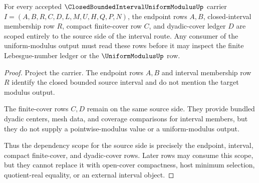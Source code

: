 \begin{theorem}
\label{thm:closed-bounded-interval-uniform-modulus-dyadic-cover-scope}
For every accepted $\ClosedBoundedIntervalUniformModulusUp$ carrier $I=(A,B,R,C,D,L,M,U,H,Q,P,N)$, the endpoint rows $A,B$, closed-interval membership row $R$, compact finite-cover row $C$, and dyadic-cover ledger $D$ are scoped entirely to the source side of the interval route. Any consumer of the uniform-modulus output must read these rows before it may inspect the finite Lebesgue-number ledger or the $\UniformModulusUp$ row.
\end{theorem}
\begin{proof}
Project the carrier. The endpoint rows $A,B$ and interval membership row $R$ identify the closed bounded source interval and do not mention the target modulus output.

The finite-cover rows $C,D$ remain on the same source side. They provide bundled dyadic centers, mesh data, and coverage comparisons for interval members, but they do not supply a pointwise-modulus value or a uniform-modulus output.

Thus the dependency scope for the source side is precisely the endpoint, interval, compact finite-cover, and dyadic-cover rows. Later rows may consume this scope, but they cannot replace it with open-cover compactness, host minimum selection, quotient-real equality, or an external interval object.
\end{proof}


